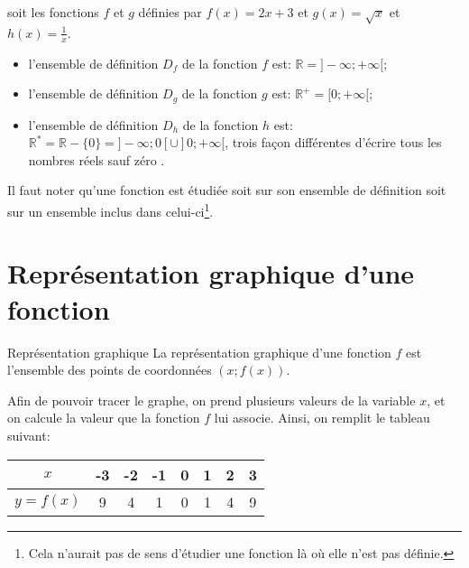 \documentclass[a4paper,12pt]{scrartcl}
\begin{document}
\exemple{} soit les fonctions $f$ et $g$ définies par $f(x) = 2x +3$   et $g(x) = \sqrt{x}$ et $h(x) = \frac{1}{x}$.

\begin{itemize}
\item l'ensemble de définition $D_f$ de la fonction $f$ est: $\mathbb{R} = ]-\infty ; +\infty[$;
\item l'ensemble de définition $D_g$ de la fonction $g$ est: $\mathbb{R}^+ = [0 ; +\infty[$;
\item l'ensemble de définition $D_h$ de la fonction $h$ est: $\mathbb{R}^* = \mathbb{R} - \{ 0 \} = ]-\infty ; 0[ \cup ] 0 ; +\infty[$, trois façon différentes d'écrire \og tous les nombres réels sauf zéro \fg{}.
\end{itemize}



Il faut noter qu'une fonction est étudiée soit sur son ensemble de définition soit sur un ensemble inclus dans celui-ci\footnote{Cela n'aurait pas de sens d'étudier une fonction là où elle n'est pas définie.}. 

\section{Représentation graphique d'une fonction}

\begin{definition}{Représentation graphique}
La représentation graphique d'une fonction $f$ est l'ensemble des points de coordonnées $(x ; f(x))$.
\end{definition}


Afin de pouvoir tracer le graphe, on prend plusieurs valeurs de la variable $x$, et on calcule la valeur que la fonction $f$ lui associe. Ainsi, on remplit le tableau suivant:

\begin{center}
\begin{tabular}{|c|c|c|c|c|c|c|c|}
\hline 
$x$ & -3 & -2 & -1 & 0 & 1 & 2 & 3 \\ 
\hline 
$y = f(x)$ & 9 & 4 & 1 & 0 & 1 & 4 & 9 \\ 
\hline 
\end{tabular} 
\end{center}
\end{document}
